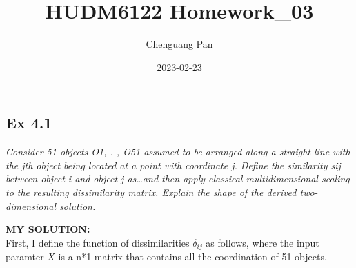 \documentclass[
]{article}
\title{HUDM6122 Homework\_03}
\author{Chenguang Pan}
\date{2023-02-23}
\begin{document}
\maketitle

\hypertarget{ex-4.1}{%
\subsection{Ex 4.1}\label{ex-4.1}}

\emph{Consider 51 objects O1, . , O51 assumed to be arranged along a
straight line with the jth object being located at a point with
coordinate j. Define the similarity sij between object i and object j
as\ldots and then apply classical multidimensional scaling to the
resulting dissimilarity matrix. Explain the shape of the derived
two-dimensional solution.}

\textbf{MY SOLUTION:}\\
First, I define the function of dissimilarities \(\delta_{ij}\) as
follows, where the input paramter \(X\) is a n*1 matrix that contains
all the coordination of 51 objects.
\end{document}
